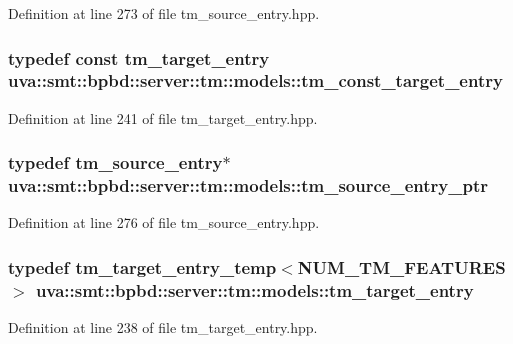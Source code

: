 Definition at line 273 of file tm\+\_\+source\+\_\+entry.\+hpp.

\hypertarget{namespaceuva_1_1smt_1_1bpbd_1_1server_1_1tm_1_1models_ae043b2a8672e39fe61239f7f1ece86ab}{}
\subsubsection[{tm\+\_\+const\+\_\+target\+\_\+entry}]{\setlength{\rightskip}{0pt plus 5cm}typedef const {\bf tm\+\_\+target\+\_\+entry} {\bf uva\+::smt\+::bpbd\+::server\+::tm\+::models\+::tm\+\_\+const\+\_\+target\+\_\+entry}}\label{namespaceuva_1_1smt_1_1bpbd_1_1server_1_1tm_1_1models_ae043b2a8672e39fe61239f7f1ece86ab}


Definition at line 241 of file tm\+\_\+target\+\_\+entry.\+hpp.

\hypertarget{namespaceuva_1_1smt_1_1bpbd_1_1server_1_1tm_1_1models_a1d82a5b873eb7c02ad8b187f7c1b5a8e}{}
\subsubsection[{tm\+\_\+source\+\_\+entry\+\_\+ptr}]{\setlength{\rightskip}{0pt plus 5cm}typedef {\bf tm\+\_\+source\+\_\+entry}$\ast$ {\bf uva\+::smt\+::bpbd\+::server\+::tm\+::models\+::tm\+\_\+source\+\_\+entry\+\_\+ptr}}\label{namespaceuva_1_1smt_1_1bpbd_1_1server_1_1tm_1_1models_a1d82a5b873eb7c02ad8b187f7c1b5a8e}


Definition at line 276 of file tm\+\_\+source\+\_\+entry.\+hpp.

\hypertarget{namespaceuva_1_1smt_1_1bpbd_1_1server_1_1tm_1_1models_a43e25042ab4fd684acdfeb24099aefa0}{}
\subsubsection[{tm\+\_\+target\+\_\+entry}]{\setlength{\rightskip}{0pt plus 5cm}typedef {\bf tm\+\_\+target\+\_\+entry\+\_\+temp}$<$N\+U\+M\+\_\+\+T\+M\+\_\+\+F\+E\+A\+T\+U\+R\+E\+S$>$ {\bf uva\+::smt\+::bpbd\+::server\+::tm\+::models\+::tm\+\_\+target\+\_\+entry}}\label{namespaceuva_1_1smt_1_1bpbd_1_1server_1_1tm_1_1models_a43e25042ab4fd684acdfeb24099aefa0}


Definition at line 238 of file tm\+\_\+target\+\_\+entry.\+hpp.

